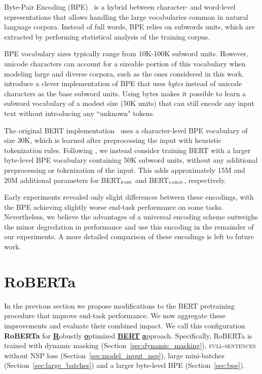 Byte-Pair Encoding (BPE)~\cite{sennrich2016neural} is a hybrid between character- and word-level representations that allows handling the large vocabularies common in natural language corpora. Instead of full words, BPE relies on subwords units, which are extracted by performing statistical analysis of the training corpus.

BPE vocabulary sizes typically range from 10K-100K subword units. However, unicode characters can account for a sizeable portion of this vocabulary when modeling large and diverse corpora, such as the ones considered in this work.
 introduce a clever implementation of BPE that uses \emph{bytes} instead of unicode characters as the base subword units. Using bytes makes it possible to learn a subword vocabulary of a modest size (50K units) that can still encode any input text without introducing any ``unknown" tokens.

The original BERT implementation~\cite{devlin2018bert} uses a character-level BPE vocabulary of size 30K, which is learned after preprocessing the input with heuristic tokenization rules. Following , we instead consider training BERT with a larger byte-level BPE vocabulary containing 50K subword units, without any additional preprocessing or tokenization of the input. This adds approximately 15M and 20M additional parameters for BERT$_{\textsc{base}}$ and BERT$_{\textsc{large}}$, respectively.

Early experiments revealed only slight differences between these encodings, with the  BPE achieving slightly worse end-task performance on some tasks. Nevertheless, we believe the advantages of a universal encoding scheme outweighs the minor degredation in performance and use this encoding in the remainder of our experiments. A more detailed comparison of these encodings is left to future work.

\section{RoBERTa} \label{sec:roberta}

In the previous section we propose modifications to the BERT pretraining procedure that improve end-task performance. We now aggregate these improvements and evaluate their combined impact. We call this configuration \textbf{RoBERTa} for \underline{\textbf{R}}obustly \underline{\textbf{o}}ptimized \underline{\textbf{BERT}} \underline{\textbf{a}}pproach.
Specifically, RoBERTa is trained with dynamic masking (Section~\ref{sec:dynamic_masking}), \textsc{full-sentences} without NSP loss (Section~\ref{sec:model_input_nsp}), large mini-batches (Section~\ref{sec:large_batches}) and a larger byte-level BPE (Section~\ref{sec:bpe}).

